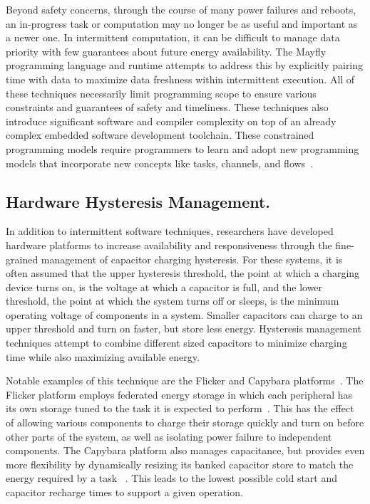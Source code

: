 Beyond safety concerns, through the course of many power failures and reboots, an in-progress task or computation may no longer be as useful and important as a newer one.
In intermittent computation, it can be difficult to manage data priority with few guarantees about future energy availability. The Mayfly~\cite{hesterTimely17} programming language and runtime attempts to address this by explicitly pairing time with data to maximize data freshness within intermittent execution.
All of these techniques necessarily limit programming scope to ensure various constraints and guarantees of safety and timeliness. These techniques also introduce significant software and compiler complexity on top of an already complex embedded software development toolchain.
These constrained programming models require programmers to learn and adopt new programming models that incorporate new concepts like tasks, channels, and flows~\cite{colin2016chain,maeng2017alpaca,hesterTimely17}.

\subsection{Hardware Hysteresis Management.}
In addition to intermittent software techniques, researchers have developed
hardware platforms to
increase availability and responsiveness through the fine-grained management
of capacitor charging hysteresis.
For these systems,
it is often assumed that the upper hysteresis threshold, the point at which a
charging device turns on, is the voltage at which a capacitor is full, and the
lower threshold, the point at which the system turns off or sleeps, is the minimum
operating voltage of components in a system.
Smaller capacitors can charge to an upper
threshold and turn on faster, but store less energy.  Hysteresis management
techniques attempt to combine different sized capacitors to
minimize charging time while also maximizing available energy.

Notable examples of this technique are the Flicker and Capybara platforms~\cite{hesterFlicker17, colinReconfigurable18}.
The Flicker
platform employs federated
energy storage in which each peripheral has its own storage tuned to the task
it is expected to perform~\cite{hesterTragedy15,hesterFlicker17}. This has the
effect of allowing various components to charge their storage quickly and turn on before other parts of the system, as well
as isolating power failure to independent components.
The Capybara platform also manages capacitance,
but provides even more flexibility by dynamically resizing its banked
capacitor store to match the energy required by a task
~\cite{colinReconfigurable18}. This leads to the lowest possible cold start and capacitor recharge times to support a given operation.

